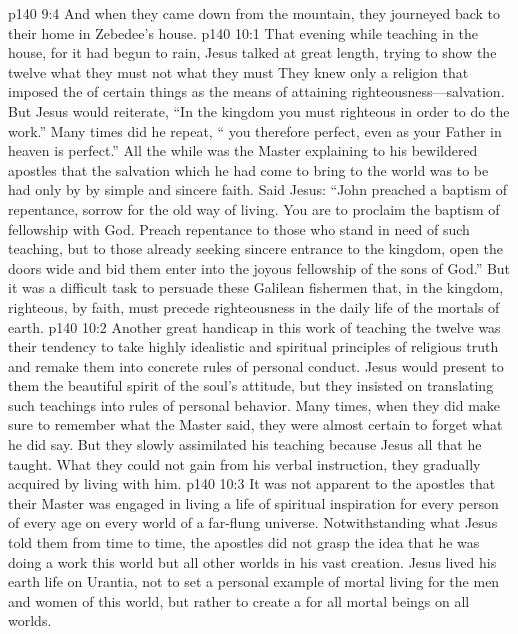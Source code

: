 \pc \vs p140 9:4 And when they came down from the mountain, they journeyed back to their home in Zebedee’s house.
\vs p140 10:1 That evening while teaching in the house, for it had begun to rain, Jesus talked at great length, trying to show the twelve what they must  not what they must  They knew only a religion that imposed the  of certain things as the means of attaining righteousness---salvation. But Jesus would reiterate, \textcolor{ubdarkred}{“In the kingdom you must  righteous in order to do the work.”} Many times did he repeat, \textcolor{ubdarkred}{“ you therefore perfect, even as your Father in heaven is perfect.”} All the while was the Master explaining to his bewildered apostles that the salvation which he had come to bring to the world was to be had only by  by simple and sincere faith. Said Jesus: \textcolor{ubdarkred}{“John preached a baptism of repentance, sorrow for the old way of living. You are to proclaim the baptism of fellowship with God. Preach repentance to those who stand in need of such teaching, but to those already seeking sincere entrance to the kingdom, open the doors wide and bid them enter into the joyous fellowship of the sons of God.”} But it was a difficult task to persuade these Galilean fishermen that, in the kingdom,  righteous, by faith, must precede  righteousness in the daily life of the mortals of earth.
\pc \vs p140 10:2 Another great handicap in this work of teaching the twelve was their tendency to take highly idealistic and spiritual principles of religious truth and remake them into concrete rules of personal conduct. Jesus would present to them the beautiful spirit of the soul’s attitude, but they insisted on translating such teachings into rules of personal behavior. Many times, when they did make sure to remember what the Master said, they were almost certain to forget what he did  say. But they slowly assimilated his teaching because Jesus  all that he taught. What they could not gain from his verbal instruction, they gradually acquired by living with him.
\vs p140 10:3 It was not apparent to the apostles that their Master was engaged in living a life of spiritual inspiration for every person of every age on every world of a far\hyp{}flung universe. Notwithstanding what Jesus told them from time to time, the apostles did not grasp the idea that he was doing a work  this world but  all other worlds in his vast creation. Jesus lived his earth life on Urantia, not to set a personal example of mortal living for the men and women of this world, but rather to create a  for all mortal beings on all worlds.
